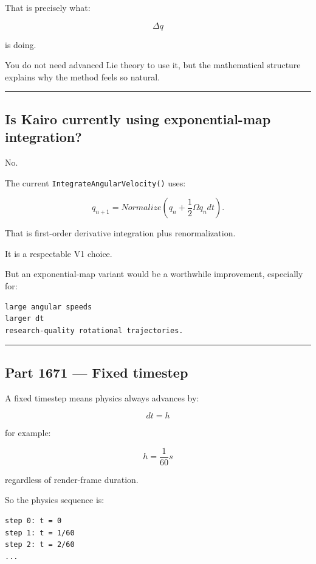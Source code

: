 That is precisely what:

\[
\Delta q
\]

is doing.

You do not need advanced Lie theory to use it, but the mathematical structure explains why the method feels so natural.

\begin{center}\rule{0.5\linewidth}{0.5pt}\end{center}

\subsection{Is Kairo currently using exponential-map integration?}\label{06-engine-ii-ch037-is-kairo-currently-using-exponential-map-integration}

No.

The current \texttt{IntegrateAngularVelocity()} uses:

\[
q_{n+1}
=
Normalize(
q_n+
\frac12\Omega q_n dt
).
\]

That is first-order derivative integration plus renormalization.

It is a respectable V1 choice.

But an exponential-map variant would be a worthwhile improvement, especially for:

\begin{verbatim}
large angular speeds
larger dt
research-quality rotational trajectories.
\end{verbatim}

\begin{center}\rule{0.5\linewidth}{0.5pt}\end{center}

\subsection{Part 1671 --- Fixed timestep}\label{06-engine-ii-ch037-part-1671-fixed-timestep}

A fixed timestep means physics always advances by:

\[
\boxed{
dt=h
}
\]

for example:

\[
h=\frac1{60}s
\]

regardless of render-frame duration.

So the physics sequence is:

\begin{verbatim}
step 0: t = 0
step 1: t = 1/60
step 2: t = 2/60
...
\end{verbatim}

